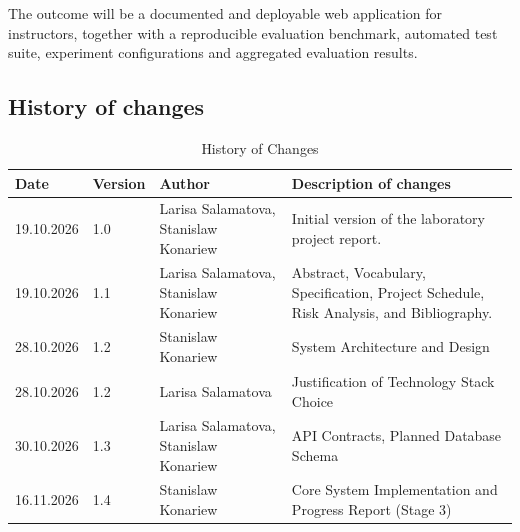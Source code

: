 \documentclass[12pt,a4paper]{article}
\begin{document}
The outcome will be a documented and deployable web application for instructors, together with a reproducible evaluation benchmark, automated test suite, experiment configurations and aggregated evaluation results.

\clearpage


\setcounter{section}{1}
\setcounter{subsection}{0}

\subsection{History of changes}
\label{sec:history}
\thispagestyle{fancy}

\begin{table}[htbp]
    \centering
    \renewcommand{\arraystretch}{1.4}
    \begin{tabularx}{\textwidth}{|p{25mm}|p{20mm}|p{45mm}|X|}
        \hline
        \textbf{Date} &
        \textbf{Version} &
        \textbf{Author} &
        \textbf{Description of changes} \\
        \hline
        19.10.2026 &
        1.0 &
        Larisa Salamatova, Stanislaw Konariew &
        Initial version of the laboratory project report. \\
        \hline
        19.10.2026 &
        1.1 &
        Larisa Salamatova, Stanislaw Konariew &
        Abstract, Vocabulary, Specification, Project Schedule,
        Risk Analysis, and Bibliography. \\
        \hline
        28.10.2026 &
        1.2 &
        Stanislaw Konariew &
        System Architecture and Design\\
        \hline
        28.10.2026 &
        1.2 &
        Larisa Salamatova &
        Justification of Technology Stack Choice\\
        \hline
        30.10.2026 &
        1.3 &
        Larisa Salamatova, Stanislaw Konariew &
        API Contracts, Planned Database Schema\\
        \hline
        16.11.2026 &
        1.4 &
        Stanislaw Konariew &
        Core System Implementation and Progress Report (Stage 3)\\
        \hline
    \end{tabularx}
    \caption{History of Changes}
    \label{tab:history-changes}
\end{table}

\clearpage
\end{document}
